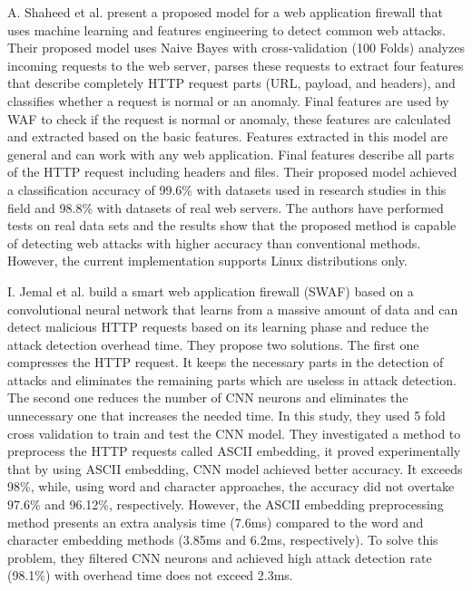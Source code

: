 A. Shaheed et al. \cite{Shaheed} present a proposed model for a web application firewall that uses machine learning and features engineering to detect common web attacks. Their proposed model uses Naive Bayes with cross-validation (100 Folds) analyzes incoming requests to the web server, parses these requests to extract four features that describe completely HTTP request parts (URL, payload, and headers), and classifies whether a request is normal or an anomaly. Final features are used by WAF to check if the request is normal or anomaly, these features are calculated and extracted based on the basic features. Features extracted in this model are general and can work with any web application. Final features describe all parts of the HTTP request including headers and files. Their proposed model achieved a classification accuracy of 99.6\% with datasets used in research studies in this field and 98.8\% with datasets of real web servers. The authors have performed tests on real data sets and the results show that the proposed method is capable of detecting web attacks with higher accuracy than conventional methods. However, the current implementation supports Linux distributions only. 

I. Jemal et al. \cite{Jemal} build a smart web application ﬁrewall (SWAF) based on a convolutional neural network that learns from a massive amount of data and can detect malicious HTTP requests based on its learning phase and reduce the attack detection overhead time. They propose two solutions. The ﬁrst one compresses the HTTP request. It keeps the necessary parts in the detection of attacks and eliminates the remaining parts which are useless in attack detection. The second one reduces the number of CNN neurons and eliminates the unnecessary one that increases the needed time. In this study, they used 5 fold cross validation to train and test the CNN model. They investigated a method to preprocess the HTTP requests called ASCII embedding, it proved experimentally that by using ASCII embedding, CNN model achieved better accuracy. It exceeds 98\%, while, using word and character approaches, the accuracy did not overtake 97.6\% and 96.12\%, respectively. However, the ASCII embedding preprocessing method presents an extra analysis time (7.6ms) compared to the word and character embedding methods (3.85ms and 6.2ms, respectively). To solve this problem, they filtered CNN neurons and achieved high attack detection rate (98.1\%) with overhead time does not exceed 2.3ms.

